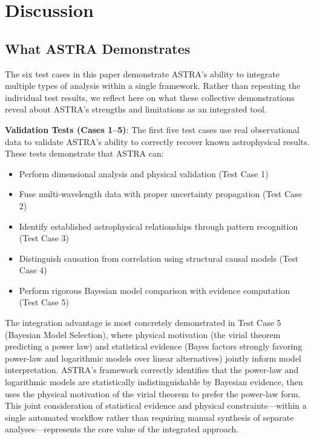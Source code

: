 \documentclass[usenatbib]{rasti}
\begin{document}
\section{Discussion}

\subsection{What ASTRA Demonstrates}

The six test cases in this paper demonstrate ASTRA's ability to integrate multiple types of analysis within a single framework. Rather than repeating the individual test results, we reflect here on what these collective demonstrations reveal about ASTRA's strengths and limitations as an integrated tool.

\textbf{Validation Tests (Cases 1--5)}: The first five test cases use real observational data to validate ASTRA's ability to correctly recover known astrophysical results. These tests demonstrate that ASTRA can:
\begin{itemize}
\item Perform dimensional analysis and physical validation (Test Case 1)
\item Fuse multi-wavelength data with proper uncertainty propagation (Test Case 2)
\item Identify established astrophysical relationships through pattern recognition (Test Case 3)
\item Distinguish causation from correlation using structural causal models (Test Case 4)
\item Perform rigorous Bayesian model comparison with evidence computation (Test Case 5)
\end{itemize}

The integration advantage is most concretely demonstrated in Test Case 5 (Bayesian Model Selection), where physical motivation (the virial theorem predicting a power law) and statistical evidence (Bayes factors strongly favoring power-law and logarithmic models over linear alternatives) jointly inform model interpretation. ASTRA's framework correctly identifies that the power-law and logarithmic models are statistically indistinguishable by Bayesian evidence, then uses the physical motivation of the virial theorem to prefer the power-law form. This joint consideration of statistical evidence and physical constraints---within a single automated workflow rather than requiring manual synthesis of separate analyses---represents the core value of the integrated approach.
\end{document}
